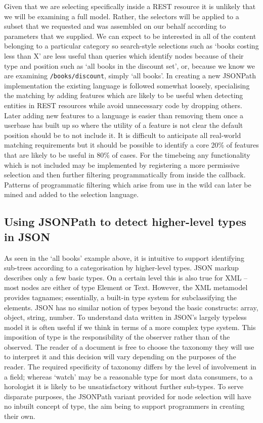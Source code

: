 \documentclass[12pt, ]{article}
\begin{document}
Given that we are selecting specifically inside a REST resource it is
unlikely that we will be examining a full model. Rather, the selectors
will be applied to a subset that we requested and was assembled on our
behalf according to parameters that we supplied. We can expect to be
interested in all of the content belonging to a particular category so
search-style selections such as `books costing less than X' are less
useful than queries which identify nodes because of their type and
position such as `all books in the discount set', or, because we know we
are examining \texttt{/books/discount}, simply `all books'. In creating
a new JSONPath implementation the existing language is followed somewhat
loosely, specialising the matching by adding features which are likely
to be useful when detecting entities in REST resources while avoid
unnecessary code by dropping others. Later adding new features to a
language is easier than removing them once a userbase has built up so
where the utility of a feature is not clear the default position should
be to not include it. It is difficult to anticipate all real-world
matching requirements but it should be possible to identify a core 20\%
of features that are likely to be useful in 80\% of cases. For the
timebeing any functionality which is not included may be implemented by
registering a more permissive selection and then further filtering
programmatically from inside the callback. Patterns of programmatic
filtering which arise from use in the wild can later be mined and added
to the selection language.

\subsection{Using JSONPath to detect higher-level types in
JSON}\label{using-jsonpath-to-detect-higher-level-types-in-json}

As seen in the `all books' example above, it is intuitive to support
identifying sub-trees according to a categorisation by higher-level
types. JSON markup describes only a few basic types. On a certain level
this is also true for XML -- most nodes are either of type Element or
Text. However, the XML metamodel provides tagnames; essentially, a
built-in type system for subclassifying the elements. JSON has no
similar notion of types beyond the basic constructs: array, object,
string, number. To understand data written in JSON's largely typeless
model it is often useful if we think in terms of a more complex type
system. This imposition of type is the responsibility of the observer
rather than of the observed. The reader of a document is free to choose
the taxonomy they will use to interpret it and this decision will vary
depending on the purposes of the reader. The required specificity of
taxonomy differs by the level of involvement in a field; whereas `watch'
may be a reasonable type for most data consumers, to a horologist it is
likely to be unsatisfactory without further sub-types. To serve
disparate purposes, the JSONPath variant provided for node selection
will have no inbuilt concept of type, the aim being to support
programmers in creating their own.
\end{document}
